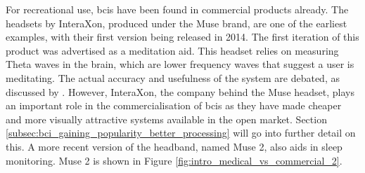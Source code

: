 For recreational use, \glspl{bci} have been found in commercial products already.
The headsets by InteraXon, produced under the Muse brand, are one of the earliest examples, with their first version being released in 2014.
The first iteration of this product was advertised as a meditation aid.
This headset relies on measuring Theta waves in the brain, which are lower frequency waves that suggest a user is meditating.
The actual accuracy and usefulness of the system are debated, as discussed by \citet{interaxon_tests}.
However, InteraXon, the company behind the Muse headset, plays an important role in the commercialisation of \glspl{bci} as they have made cheaper and more visually attractive systems available in the open market.
Section \ref{subsec:bci_gaining_popularity_better_processing} will go into further detail on this.
A more recent version of the headband, named Muse 2, also aids in sleep monitoring.
Muse 2 is shown in Figure \ref{fig:intro_medical_vs_commercial_2}.

